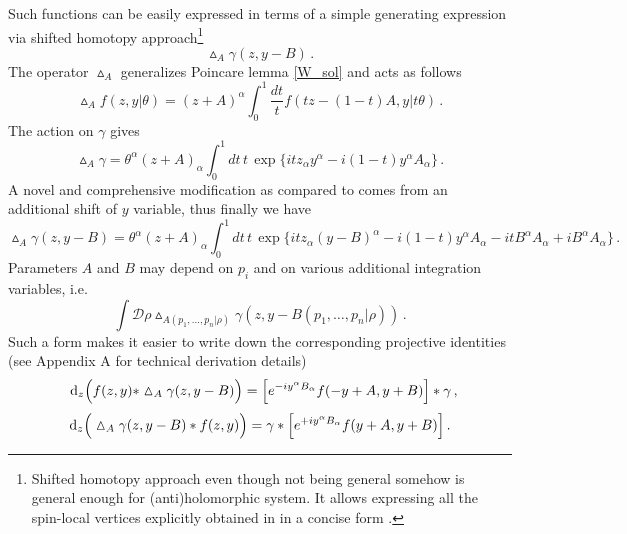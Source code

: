 \documentclass[12pt]{article}
\newcommand{\dr}{{{\rm d}}}
\newcommand{\hmt}{\vartriangle}
\begin{document}
Such functions can be easily expressed in terms of a simple generating expression via shifted homotopy approach\footnote{Shifted homotopy approach even though not being general somehow is general enough for (anti)holomorphic system. It allows expressing all the spin-local vertices explicitly obtained in \cite{Didenko:2024zpd} in a concise form \cite{Korybut:2025vdn}.} \cite{Gelfond:2018vmi}
\begin{equation}\label{projective_1form}
\hmt_A \gamma(z,y-B)\,.
\end{equation}
The operator $\hmt_A$ generalizes Poincare lemma \eqref{W_sol} and acts as follows
\begin{equation}\label{shifted_homotopy}
\hmt_A f(z,y|\theta)=(z+A)^\alpha\int_0^1\dfrac{dt}{t}f(tz-(1-t)A,y|t\theta)\,.
\end{equation}
The action on $\gamma$ gives
\begin{equation}
\hmt_A \gamma=\theta^\alpha(z+A)_\alpha \int_0^1 dt\, t \, \exp\{itz_\alpha y^\alpha-i(1-t)y^\alpha A_\alpha\}\,.
\end{equation} 
A novel and comprehensive modification as compared to \cite{Korybut:2025vdn}
comes from an additional shift of $y$ variable, thus finally we have
\begin{equation}
\hmt_A \gamma(z,y-B)=\theta^\alpha(z+A)_\alpha \int_0^1 dt\, t \, \exp\{itz_\alpha (y-B)^\alpha-i(1-t)y^\alpha A_\alpha-itB^\alpha A_\alpha+iB^\alpha A_\alpha\}\,.
\end{equation} 
Parameters $A$ and $B$ may depend on $p_i$ and on various additional integration variables, i.e.
\begin{equation}
\int \mathscr{D}\rho \hmt_{A(p_1,\ldots,p_n|\rho)}\gamma(z,y-B(p_1,\ldots, p_n|\rho))\,.
\end{equation}
Such a form makes it easier to write down the corresponding projective identities (see Appendix A for technical derivation details)
\begin{equation}\label{Proj_R}
\; \; \dr_z\Big(f(z,y)\ast \hmt_A\gamma(z,y-B)\Big)=\Big[e^{-iy^\alpha B_\alpha} f(-y+A,y+B)\Big]\ast \gamma\,,
\end{equation}
\begin{equation}\label{Proj_L}
\dr_z\Big(\hmt_A\gamma(z,y-B)\ast f(z,y)\Big)=\gamma\ast \Big[e^{+iy^\alpha B_\alpha} f(y+A,y+B)\Big]\,.
\end{equation}
\end{document}
